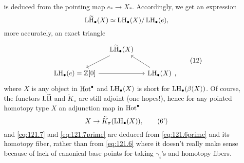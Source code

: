 is deduced from the pointing map $e_*\to X_*$. Accordingly, we get an
expression
\[\operatorname{L\widetilde H}_\bullet(X) \simeq \operatorname{LH}_\bullet(X)/\operatorname{LH}_\bullet(e),\]
more accurately, an exact triangle
\begin{equation}
  \label{eq:121.12}
  \begin{tabular}{@{}c@{}}
    \begin{tikzcd}[baseline=(O.base),column sep=small]
      & \LtH_\bullet(X) \ar[dl] & \\
      \LH_\bullet(e)=\bZ[0] \ar[rr] & &
      |[alias=O]| \LH_\bullet(X)\ar[ul]
    \end{tikzcd},
  \end{tabular}\tag{12}
\end{equation}
where $X$ is any object in $\operatorname{Hot}^\bullet$ and $\operatorname{LH}_\bullet(X)$ is
short for $\operatorname{LH}_\bullet(\beta(X))$. Of course, the functors $\operatorname{L\widetilde H}$ and
$\widetilde K_\pi$ are still adjoint (one hopes!), hence for any pointed
homotopy type $X$ an adjunction map in $\operatorname{Hot}^\bullet$
\begin{equation}
  \label{eq:121.6prime}
  X\to\widetilde K_\pi(\operatorname{LH}_\bullet(X)),\tag{6'}
\end{equation}
and \eqref{eq:121.7} and \eqref{eq:121.7prime} are deduced from
\eqref{eq:121.6prime} and its homotopy fiber, rather than from
\eqref{eq:121.6} where it doesn't really make sense because of lack of
canonical base points for taking $\gamma_i$'s and homotopy fibers.

\bigbreak

\presectionfill{}\par


